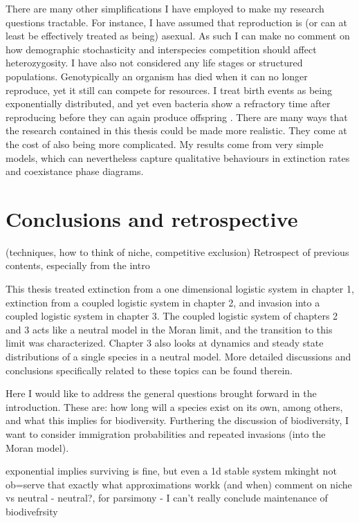 There are many other simplifications I have employed to make my research questions tractable. 
For instance, I have assumed that reproduction is (or can at least be effectively treated as being) asexual. 
As such I can make no comment on how demographic stochasticity and interspecies competition should affect heterozygosity. 
I have also not considered any life stages or structured populations. 
Genotypically an organism has died when it can no longer reproduce, yet it still can compete for resources. 
I treat birth events as being exponentially distributed, and yet even bacteria show a refractory time after reproducing before they can again produce offspring \cite{Altan-Bonnet???}. 
There are many ways that the research contained in this thesis could be made more realistic. 
They come at the cost of also being more complicated. 
My results come from very simple models, which can nevertheless capture qualitative behaviours in extinction rates and coexistance phase diagrams. 



\section{Conclusions and retrospective}
(techniques, how to think of niche, competitive exclusion)
Retrospect of previous contents, especially from the intro

This thesis treated extinction from a one dimensional logistic system in chapter 1, extinction from a coupled logistic system in chapter 2, and invasion into a coupled logistic system in chapter 3. The coupled logistic system of chapters 2 and 3 acts like a neutral model in the Moran limit, and the transition to this limit was characterized. Chapter 3 also looks at dynamics and steady state distributions of a single species in a neutral model. %
More detailed discussions and conclusions specifically related to these topics can be found therein. 

Here I would like to address the general questions brought forward in the introduction. 
These are: how long will a species exist on its own, among others, and what this implies for biodiversity. 
Furthering the discussion of biodiversity, I want to consider immigration probabilities and repeated invasions (into the Moran model). 

exponential implies surviving is fine, but even a 1d stable system mkinght not ob=serve that exactly
what approximations workk (and when)
comment on niche vs neutral - neutral?, for parsimony - I can't really conclude
maintenance of biodivefrsity

